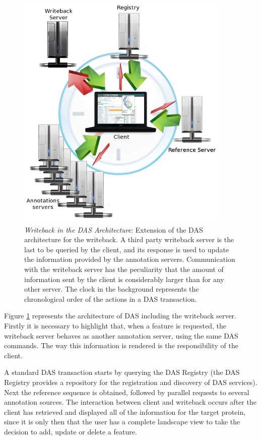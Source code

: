 \begin{figure}[ht] 
\centering
\includegraphics[width=4in]{figures/WritebackArchitecture.png} 
\caption[Writeback in the DAS Architecture]{\emph{Writeback in the DAS Architecture}: Extension of the DAS architecture for the writeback. A third party writeback server is the last to be queried by the client, and its response is used to update the information provided by the annotation servers. Communication with the writeback server has the peculiarity that the amount of information sent by the client is considerably larger than for any other server. The clock in the background represents the chronological order of the actions in a DAS transaction.}  \label{fig: WritebackArchitecture}
\end{figure}

Figure \ref{fig: WritebackArchitecture} represents the architecture of DAS including the writeback server. Firstly it is necessary to highlight that, when a feature is requested, the writeback server behaves as another annotation server, using the same DAS commands. The way this information is rendered is the responsibility of the client. 

A standard DAS transaction starts by querying the DAS Registry (the DAS Registry provides a repository for the registration and discovery of DAS services). Next the reference sequence is obtained, followed by parallel requests to several annotation sources. The interaction between client and writeback occurs after the client has retrieved and displayed all of the information for the target protein, since it is only then that the user has a complete landscape view to take the decision to add, update or delete a feature.

